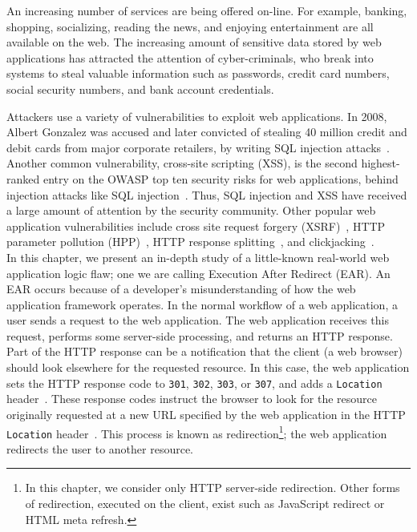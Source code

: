 



An increasing number of services are being offered on-line. For
example, banking, shopping, socializing, reading the news, and
enjoying entertainment are all available on the web. The increasing amount
of sensitive data stored by web applications has
attracted the attention of cyber-criminals, who break into systems to
steal valuable information such as passwords, credit card numbers,
social security numbers, and bank account credentials.

Attackers use a variety of vulnerabilities to exploit web applications. In
2008, Albert Gonzalez was accused and later convicted of stealing 40
million credit and debit cards from major corporate retailers, by writing
SQL injection attacks~\cite{gonzalez08:indictment,ortiz10:outcome}. Another
common vulnerability, cross-site scripting (XSS), is the second
highest-ranked entry on the OWASP top ten security risks for web
applications, behind injection attacks like SQL
injection~\cite{owasptopten}. Thus, SQL injection and XSS have received a
large amount of attention by the security community. Other popular web
application vulnerabilities include cross site request forgery
(XSRF)~\cite{barth08:csrf}, HTTP parameter pollution
(HPP)~\cite{carettoni09:hpp,balduzzi11:hpp}, HTTP response
splitting~\cite{klein04:http-response-splitting}, and
clickjacking~\cite{hansen08:clickjacking,balduzzi10:clickjacking}. 
\\

\noindent{}In this chapter, we present an in-depth study of a little-known
real-world web application logic flaw; one we are calling Execution
After Redirect (EAR). An EAR occurs because of a developer's
misunderstanding of how the web application framework operates. In the
normal workflow of a web application, a user sends a request to the web
application. The web application receives this request, performs some
server-side processing, and returns an HTTP response. Part of the HTTP
response can be a notification that the client (a web browser) should look
elsewhere for the requested resource. In this case, the web application
sets the HTTP response code to \texttt{301}, \texttt{302},
\texttt{303}, or \texttt{307}, and adds a \texttt{Location}
header~\cite{fielding99:http11statuscode}. These response codes instruct
the browser to look for the resource originally requested at a new URL
specified by the web application in the HTTP \texttt{Location}
header~\cite{fielding99:http11location}. This process is known as
redirection\footnote{In this chapter, we consider only HTTP server-side
  redirection. Other forms of redirection, executed on the client, exist
  such as JavaScript redirect or HTML meta refresh.}; the web application
redirects the user to another resource.

